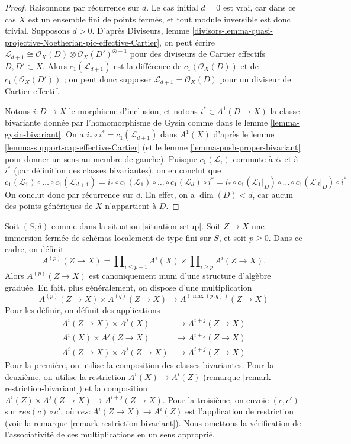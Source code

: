 \begin{proof}
Raisonnons par récurrence sur $d$. Le cas initial $d = 0$ est vrai, car
dans ce cas $X$ est un ensemble fini de points fermés, et tout module
inversible est donc trivial. Supposons $d > 0$. D'après Diviseurs, lemme
\ref{divisors-lemma-quasi-projective-Noetherian-pic-effective-Cartier},
on peut écrire $\mathcal{L}_{d + 1} \cong \mathcal{O}_X(D) \otimes
\mathcal{O}_X(D')^{\otimes -1}$ pour des diviseurs de Cartier effectifs
$D, D' \subset X$. Alors $c_1(\mathcal{L}_{d + 1})$ est la différence
de $c_1(\mathcal{O}_X(D))$ et de $c_1(\mathcal{O}_X(D'))$ ; on peut donc
supposer $\mathcal{L}_{d + 1} = \mathcal{O}_X(D)$ pour un
diviseur de Cartier effectif.

\medskip\noindent
Notons $i : D \to X$ le morphisme d'inclusion, et notons
$i^* \in A^1(D \to X)$ la classe bivariante donnée par
l'homomorphisme de Gysin comme dans le lemme \ref{lemma-gysin-bivariant}.
On a $i_* \circ i^* = c_1(\mathcal{L}_{d + 1})$
dans $A^1(X)$ d'après le lemme \ref{lemma-support-cap-effective-Cartier}
(et le lemme \ref{lemma-push-proper-bivariant}
pour donner un sens au membre de gauche).
Puisque $c_1(\mathcal{L}_i)$ commute
à $i_*$ et à $i^*$ (par définition des classes bivariantes),
on en conclut que
$$
c_1(\mathcal{L}_1) \circ \ldots \circ c_1(\mathcal{L}_{d + 1}) =
i_* \circ c_1(\mathcal{L}_1) \circ \ldots \circ c_1(\mathcal{L}_d) \circ i^* =
i_* \circ c_1(\mathcal{L}_1|_D) \circ \ldots \circ c_1(\mathcal{L}_d|_D)
\circ i^*
$$
On conclut donc par récurrence sur $d$. En effet, on a $\dim(D) < d$,
car aucun des points génériques de $X$ n'appartient à $D$.
\end{proof}

\begin{remark}
\label{remark-ring-loc-classes}
Soit $(S, \delta)$ comme dans la situation \ref{situation-setup}.
Soit $Z \to X$ une immersion fermée de schémas localement de
type fini sur $S$, et soit $p \geq 0$. Dans ce cadre, on définit
$$
A^{(p)}(Z \to X) =
\prod\nolimits_{i \leq p - 1} A^i(X) \times
\prod\nolimits_{i \geq p} A^i(Z \to X).
$$
Alors $A^{(p)}(Z \to X)$ est canoniquement muni d'une structure
d'algèbre graduée. En fait, plus généralement, on dispose d'une multiplication
$$
A^{(p)}(Z \to X) \times A^{(q)}(Z \to X)
\longrightarrow A^{(\max(p, q))}(Z \to X)
$$
Pour les définir, on définit des applications
\begin{align*}
A^i(Z \to X) \times A^j(X) & \to A^{i + j}(Z \to X) \\
A^i(X) \times A^j(Z \to X) & \to A^{i + j}(Z \to X) \\
A^i(Z \to X) \times A^j(Z \to X) & \to A^{i + j}(Z \to X)
\end{align*}
Pour la première, on utilise la composition des classes bivariantes.
Pour la deuxième, on utilise la restriction
$A^i(X) \to A^i(Z)$ (remarque \ref{remark-restriction-bivariant}) et la
composition $A^i(Z) \times A^j(Z \to X) \to A^{i + j}(Z \to X)$.
Pour la troisième, on envoie $(c, c')$ sur $res(c) \circ c'$,
où $res : A^i(Z \to X) \to A^i(Z)$ est l'application de restriction (voir la
remarque \ref{remark-restriction-bivariant}). Nous omettons la
vérification de l'associativité de ces multiplications en un sens approprié.
\end{remark}

